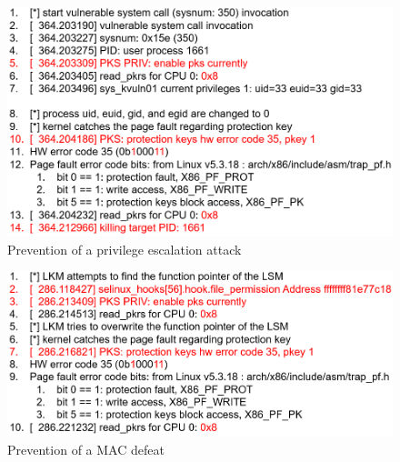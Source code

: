 \begin{figure}[t]
  \begin{center}
      \includegraphics[bb=0 0 716 425, scale=.325]{./imgs/008_screenshot_2021-08-18_3.35.12.png}
    \end{center}
    \caption{
    Prevention of a privilege escalation attack
    }
    \label{fig:kvuln1_1_04}
\end{figure}

\begin{figure}[t]
  \begin{center}
      \includegraphics[bb=0 0 719 309, scale=.325]{./imgs/009_screenshot_2021-08-18_3.35.12.png}
    \end{center}
    \caption{
    Prevention of a MAC defeat
    }
    \label{fig:defeat_mac}
\end{figure}

